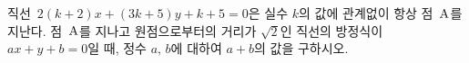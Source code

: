 직선~$2(k+2)x+(3k+5)y+k+5=0$은 실수 $k$의 값에 관계없이 항상 점~$\mathrm{A}$를 지난다. 점~$\mathrm{A}$를 지나고 원점으로부터의 거리가 $\sqrt{2}$인 직선의 방정식이 $ax+y+b=0$일 때, 정수 $a$, $b$에 대하여 $a+b$의 값을 구하시오.
